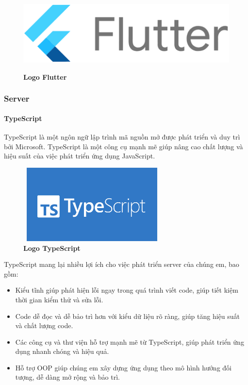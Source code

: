 \begin{figure}[H]
	\centering
	\includegraphics[width=12cm,height=4cm]{Images/Technology/flutter_logo.png}
	\caption[Logo Flutter]{\bfseries \fontsize{12pt}{0pt}
		\selectfont Logo Flutter}
	\label{flutter_cover} %
\end{figure}

\subsubsection{Server}
\paragraph{TypeScript}
\mbox{}

TypeScript là một ngôn ngữ lập trình mã nguồn mở được phát triển và duy trì bởi Microsoft. TypeScript là một công cụ mạnh mẽ giúp nâng cao chất lượng và hiệu suất của việc phát triển ứng dụng JavaScript.

\begin{figure}[H]
	\centering
	\includegraphics[width=7.5cm,height=4cm]{Images/Technology/typescript.png}
	\caption[Logo TypeScript]{\bfseries \fontsize{12pt}{0pt}
		\selectfont Logo TypeScript}
	\label{typescript} %
\end{figure}

TypeScript mang lại nhiều lợi ích cho việc phát triển server của chúng em, bao gồm:
\begin{itemize}
	\item Kiểu tĩnh giúp phát hiện lỗi ngay trong quá trình viết code, giúp tiết kiệm thời gian kiểm thử và sửa lỗi.
	\item Code dễ đọc và dễ bảo trì hơn với kiểu dữ liệu rõ ràng, giúp tăng hiệu suất và chất lượng code.
	\item Các công cụ và thư viện hỗ trợ mạnh mẽ từ TypeScript, giúp phát triển ứng dụng nhanh chóng và hiệu quả.
	\item Hỗ trợ OOP giúp chúng em xây dựng ứng dụng theo mô hình hướng đối tượng, dễ dàng mở rộng và bảo trì.
\end{itemize}

